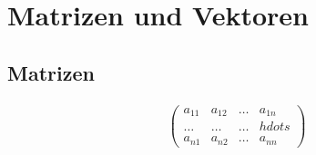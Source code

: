 \section{Matrizen und Vektoren}

\subsection{Matrizen}
\begin{mybox}


\begin{align*}
\begin{pmatrix}
a_{11} & a_{12} & \dots & a_{1n}\\
\hdots & \hdots & \hdots & hdots\\
a_{n1} & a_{n2} & \hdots & a_{nn}
\end{pmatrix}
\end{align*}
\end{mybox}